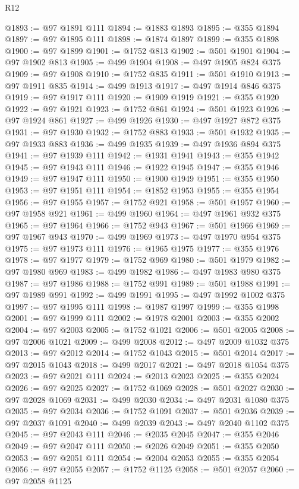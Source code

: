 \begin{lexlean}{R12}
\begin{coremodule}
{{{{{{{{{{{{{{{{{{{{{{{{{{{{{{{{{{{{{{{{{{{{{{{{{{{{{{{{{{{{{{{{{{{{{{{{{{{{{{{{{{@1893 := @97 @1891 @111
@1894 := @1883 @1893
@1895 := @355 @1894
@1897 := @97 @1895 @111
@1898 := @1874 @1897
@1899 := @355 @1898
@1900 := @97 @1899
@1901 := @1752 @813
@1902 := @501 @1901
@1904 := @97 @1902 @813
@1905 := @499 @1904
@1908 := @497 @1905 @824 @375
@1909 := @97 @1908
@1910 := @1752 @835
@1911 := @501 @1910
@1913 := @97 @1911 @835
@1914 := @499 @1913
@1917 := @497 @1914 @846 @375
@1919 := @97 @1917 @111
@1920 := @1909 @1919
@1921 := @355 @1920
@1922 := @97 @1921
@1923 := @1752 @861
@1924 := @501 @1923
@1926 := @97 @1924 @861
@1927 := @499 @1926
@1930 := @497 @1927 @872 @375
@1931 := @97 @1930
@1932 := @1752 @883
@1933 := @501 @1932
@1935 := @97 @1933 @883
@1936 := @499 @1935
@1939 := @497 @1936 @894 @375
@1941 := @97 @1939 @111
@1942 := @1931 @1941
@1943 := @355 @1942
@1945 := @97 @1943 @111
@1946 := @1922 @1945
@1947 := @355 @1946
@1949 := @97 @1947 @111
@1950 := @1900 @1949
@1951 := @355 @1950
@1953 := @97 @1951 @111
@1954 := @1852 @1953
@1955 := @355 @1954
@1956 := @97 @1955
@1957 := @1752 @921
@1958 := @501 @1957
@1960 := @97 @1958 @921
@1961 := @499 @1960
@1964 := @497 @1961 @932 @375
@1965 := @97 @1964
@1966 := @1752 @943
@1967 := @501 @1966
@1969 := @97 @1967 @943
@1970 := @499 @1969
@1973 := @497 @1970 @954 @375
@1975 := @97 @1973 @111
@1976 := @1965 @1975
@1977 := @355 @1976
@1978 := @97 @1977
@1979 := @1752 @969
@1980 := @501 @1979
@1982 := @97 @1980 @969
@1983 := @499 @1982
@1986 := @497 @1983 @980 @375
@1987 := @97 @1986
@1988 := @1752 @991
@1989 := @501 @1988
@1991 := @97 @1989 @991
@1992 := @499 @1991
@1995 := @497 @1992 @1002 @375
@1997 := @97 @1995 @111
@1998 := @1987 @1997
@1999 := @355 @1998
@2001 := @97 @1999 @111
@2002 := @1978 @2001
@2003 := @355 @2002
@2004 := @97 @2003
@2005 := @1752 @1021
@2006 := @501 @2005
@2008 := @97 @2006 @1021
@2009 := @499 @2008
@2012 := @497 @2009 @1032 @375
@2013 := @97 @2012
@2014 := @1752 @1043
@2015 := @501 @2014
@2017 := @97 @2015 @1043
@2018 := @499 @2017
@2021 := @497 @2018 @1054 @375
@2023 := @97 @2021 @111
@2024 := @2013 @2023
@2025 := @355 @2024
@2026 := @97 @2025
@2027 := @1752 @1069
@2028 := @501 @2027
@2030 := @97 @2028 @1069
@2031 := @499 @2030
@2034 := @497 @2031 @1080 @375
@2035 := @97 @2034
@2036 := @1752 @1091
@2037 := @501 @2036
@2039 := @97 @2037 @1091
@2040 := @499 @2039
@2043 := @497 @2040 @1102 @375
@2045 := @97 @2043 @111
@2046 := @2035 @2045
@2047 := @355 @2046
@2049 := @97 @2047 @111
@2050 := @2026 @2049
@2051 := @355 @2050
@2053 := @97 @2051 @111
@2054 := @2004 @2053
@2055 := @355 @2054
@2056 := @97 @2055
@2057 := @1752 @1125
@2058 := @501 @2057
@2060 := @97 @2058 @1125
}}}}}}}}}}}}}}}}}}}}}}}}}}}}}}}}}}}}}}}}}}}}}}}}}}}}}}}}}}}}}}}}}}}}}}}}}}}}}}}}}}
\end{coremodule}
\end{lexlean}
